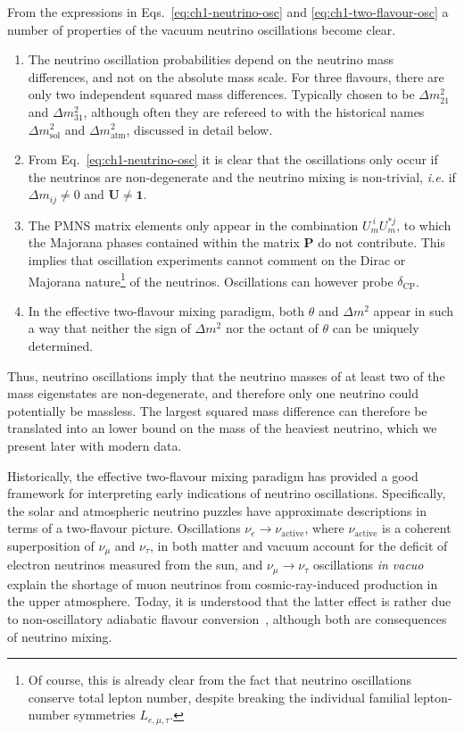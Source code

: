 From the expressions in Eqs.~\eqref{eq:ch1-neutrino-osc} and
\eqref{eq:ch1-two-flavour-osc} a number of properties of the vacuum neutrino
oscillations become clear.
\begin{enumerate}
  \item The neutrino oscillation probabilities depend on the neutrino mass
    differences, and not on the absolute mass scale. For three flavours, there
    are only two independent squared mass differences. Typically chosen to be
    $\Delta m_{21}^{2}$ and $\Delta m_{31}^{2}$, although often they are
    refereed to with the historical names $\Delta m_{\text{sol}}^{2}$ and
    $\Delta m_{\text{atm}}^{2}$, discussed in detail below.
  \item From Eq.~\eqref{eq:ch1-neutrino-osc} it is clear that the oscillations only
    occur if the neutrinos are non-degenerate and the neutrino mixing is
    non-trivial, \textit{i.e.} if $\Delta m_{ij} \neq 0$ and
    $\mathbf{U} \neq \mathbf{1}$.
  \item The PMNS matrix elements only appear in the combination
    $U_{m}^{\ i} U_{m}^{* j}$, to which the Majorana phases contained within the
    matrix $\mathbf{P}$ do not contribute. This implies that oscillation
    experiments cannot comment on the Dirac or Majorana nature\footnote{Of
    course, this is already clear from the fact that neutrino oscillations
    conserve total lepton number, despite breaking the individual familial
    lepton-number symmetries $L_{e, \mu, \tau}$.} of the neutrinos. Oscillations
    can however probe $\delta_{\text{CP}}$.
  \item In the effective two-flavour mixing paradigm, both $\theta$ and
    $\Delta m^{2}$ appear in such a way that neither the sign of $\Delta m^{2}$
    nor the octant of $\theta$ can be uniquely determined.
  \end{enumerate}
  Thus, neutrino oscillations imply that the neutrino masses of at least two of
  the mass eigenstates are non-degenerate, and therefore only one neutrino could
  potentially be massless. The largest squared mass difference can therefore be
  translated into an lower bound on the mass of the heaviest neutrino, which we
  present later with modern data.

  Historically, the effective two-flavour mixing paradigm has provided a good
  framework for interpreting early indications of neutrino oscillations.
  Specifically, the solar and atmospheric neutrino puzzles have approximate
  descriptions in terms of a two-flavour picture. Oscillations
  $\nu_{e} \to \nu_{\text{active}}$, where $\nu_{\text{active}}$ is a coherent
  superposition of $\nu_{\mu}$ and $\nu_{\tau}$, in both matter and vacuum
  account for the deficit of electron neutrinos measured from the sun, and
  $\nu_{\mu} \to \nu_{\tau}$ oscillations \textit{in vacuo} explain the shortage
  of muon neutrinos from cosmic-ray-induced production in the upper atmosphere.
  Today, it is understood that the latter effect is rather due to
  non-oscillatory adiabatic flavour conversion~\cite{Smirnov:2016xzf}, although
  both are consequences of neutrino mixing.

